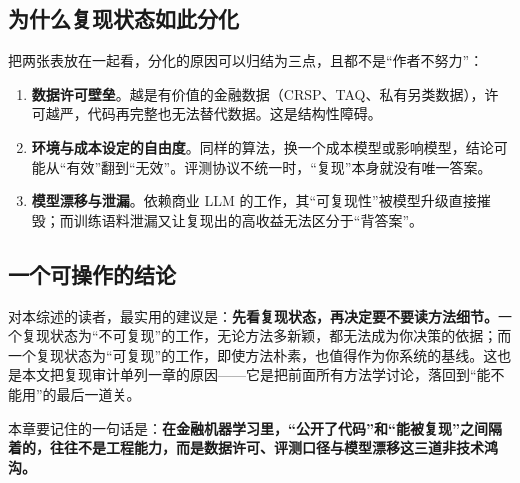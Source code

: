 \subsection{为什么复现状态如此分化}

把两张表放在一起看，分化的原因可以归结为三点，且都不是“作者不努力”：

\begin{enumerate}
  \item \textbf{数据许可壁垒}。越是有价值的金融数据（CRSP、TAQ、私有另类数据），许可越严，代码再完整也无法替代数据。这是结构性障碍。
  \item \textbf{环境与成本设定的自由度}。同样的算法，换一个成本模型或影响模型，结论可能从“有效”翻到“无效”。评测协议不统一时，“复现”本身就没有唯一答案。
  \item \textbf{模型漂移与泄漏}。依赖商业 LLM 的工作，其“可复现性”被模型升级直接摧毁；而训练语料泄漏又让复现出的高收益无法区分于“背答案”。
\end{enumerate}

\subsection{一个可操作的结论}

对本综述的读者，最实用的建议是：\textbf{先看复现状态，再决定要不要读方法细节。}一个复现状态为“不可复现”的工作，无论方法多新颖，都无法成为你决策的依据；而一个复现状态为“可复现”的工作，即使方法朴素，也值得作为你系统的基线。这也是本文把复现审计单列一章的原因——它是把前面所有方法学讨论，落回到“能不能用”的最后一道关。

本章要记住的一句话是：\textbf{在金融机器学习里，“公开了代码”和“能被复现”之间隔着的，往往不是工程能力，而是数据许可、评测口径与模型漂移这三道非技术鸿沟。}
